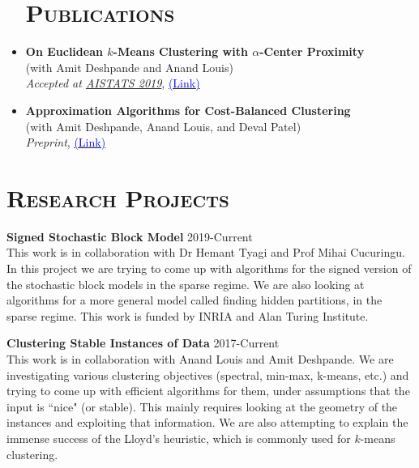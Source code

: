 \documentclass[line,margin]{res2}
\begin{document}
\begin{resume}
\begin{itemize}
\section{\textsc{Publications}}
                \item {\bf On Euclidean $k$-Means Clustering with $\alpha$-Center Proximity}\\
                (with Amit Deshpande and Anand Louis) \\
                \emph{ Accepted at \href{http://proceedings.mlr.press/v89/deshpande19a.html}{AISTATS 2019}},  \href{https://arxiv.org/abs/1804.10827}{\textcolor{blue}{(Link)}}

                \item {\bf Approximation Algorithms for Cost-Balanced Clustering}\\
                (with Amit Deshpande, Anand Louis, and Deval Patel) \\
                \emph{ Preprint}, \href{https://www.dropbox.com/s/r5uwemki3zfvvyb/min_max_km.pdf?dl=0}{\textcolor{blue}{(Link)}}
\end{itemize}
\section{\textsc{Research Projects}}
              {\bf Signed Stochastic Block Model} \hfill 2019-Current\\
              This work is in collaboration with Dr Hemant Tyagi and Prof Mihai Cucuringu. In this project we are trying to come up with algorithms for the signed version of the stochastic block models in the sparse regime. We are also looking at algorithms for a more general model called finding hidden partitions, in the sparse regime. This work is funded by INRIA and Alan Turing Institute.


              {\bf Clustering Stable Instances of Data} \hfill
                2017-Current\\
              This work is in collaboration with Anand Louis and Amit Deshpande. We are investigating various clustering objectives (spectral, min-max, k-means, etc.) and trying to come up with efficient algorithms for them, under assumptions that the input is ``nice" (or stable). This mainly requires looking at the geometry of the instances and exploiting that information. We are also attempting to explain the immense success of the Lloyd's heuristic, which is commonly used for $k$-means clustering.


\end{resume}
\end{document}
